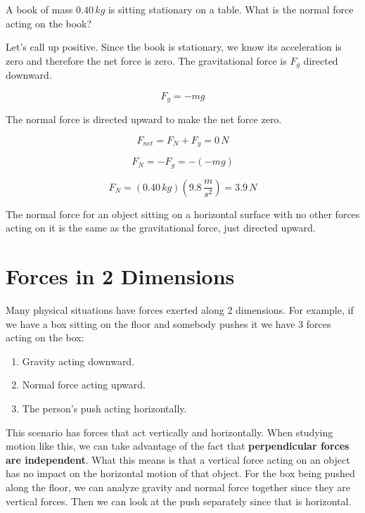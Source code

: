 \documentclass[12pt]{book}
\begin{document}
\begin{exampleblock}


A book of mass $0.40 \, kg$ is sitting stationary on a table. What is the normal force acting on the book?

\hspace{10pt}

Let's call up positive. Since the book is stationary, we know its acceleration is zero and therefore the net force is zero. The gravitational force is $F_g$ directed downward. 

\begin{equation}
F_g = -mg
\end{equation}

The normal force is directed upward to make the net force zero.

\begin{equation}
F_{net} = F_N + F_g = 0 \, N
\end{equation}

\begin{equation}
F_N = -F_g = -(-mg)
\end{equation}

\begin{equation}
F_N = (0.40 \, kg) (9.8 \, \frac{m}{s^2}) = 3.9 \, N
\end{equation}

The normal force for an object sitting on a horizontal surface with no other forces acting on it is the same as the gravitational force, just directed upward.

\end{exampleblock}

\section{Forces in 2 Dimensions}
\label{2DForces}

Many physical situations have forces exerted along 2 dimensions. For example, if we have a box sitting on the floor and somebody pushes it we have 3 forces acting on the box:

\begin{enumerate}
\item Gravity acting downward.
\item Normal force acting upward.
\item The person's push acting horizontally.
\end{enumerate}

This scenario has forces that act vertically and horizontally. When studying motion like this, we can take advantage of the fact that \textbf{perpendicular forces are independent}. What this means is that a vertical force acting on an object has no impact on the horizontal motion of that object. For the box being pushed along the floor, we can analyze gravity and normal force together since they are vertical forces. Then we can look at the push separately since that is horizontal.
\end{document}
